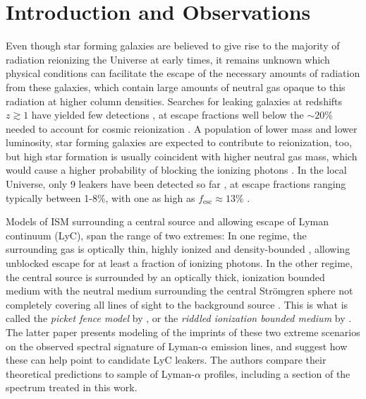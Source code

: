 \documentclass[twocolumn]{aastex61}
\begin{document}
\section{Introduction and
Observations}\label{introduction-and-observations}

Even though star forming galaxies are believed to give rise to the
majority of radiation reionizing the Universe at early times, it remains
unknown which physical conditions can facilitate the escape of the
necessary amounts of radiation from these galaxies, which contain large
amounts of neutral gas opaque to this radiation at higher column
densities. Searches for leaking galaxies at redshifts $z \gtrsim 1$ have
yielded few detections
\citep[e.g.][]{Iwata2009, Vanzella2010, Vanzella2012, Nestor2013, Cowie2009, Siana2010},
at escape fractions well below the $\sim 20\%$ needed to account for
cosmic reionization \citep{Bouwens2011, Robertson2013}. A population of
lower mass and lower luminosity, star forming galaxies are expected to
contribute to reionization, too, but high star formation is usually
coincident with higher neutral gas mass, which would cause a higher
probability of blocking the ionizing photons
\citep[e.g.][]{Erb2016, Robertson2013}. In the local Universe, only 9
leakers have been detected so far
\citep{Bergvall2006, Leitet2011, Leitet2013, Borthakur2014, Izotov2016Nat, Izotov2016MNRAS, Leitherer2016},
at escape fractions ranging typically between 1-8\%, with one as high as
$f_{\mathrm{esc}} \approx 13\%$ \citep{Izotov2016MNRAS}.

Models of ISM surrounding a central source and allowing escape of Lyman
continuum (LyC), span the range of two extremes: In one regime, the
surrounding gas is optically thin, highly ionized and density-bounded
\citep[see e.g.][]{Jaskot2013}, allowing unblocked escape for at least a
fraction of ionizing photons. In the other regime, the central source is
surrounded by an optically thick, ionization bounded medium with the
neutral medium surrounding the central Strömgren sphere not completely
covering all lines of sight to the background source \citep[see
e.g.][]{Zackrisson2013}. This is what is called the \emph{picket fence
model} by \citet{Heckman2011}, or the \emph{riddled ionization bounded
medium} by \citet{Verhamme2015}. The latter paper presents modeling of
the imprints of these two extreme scenarios on the observed spectral
signature of Lyman-$\alpha$ emission lines, and suggest how these can
help point to candidate LyC leakers. The authors compare their
theoretical predictions to sample of Lyman-$\alpha$ profiles, including
a section of the spectrum treated in this work.
\end{document}
